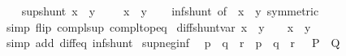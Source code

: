 \begin{isabellebody}
\endisatagproof
{\isafoldproof}%
%
\isadelimproof
\isanewline
%
\endisadelimproof
\ \ \isanewline
{}\isamarkupfalse%
\ sup{\isacharunderscore}{\kern0pt}shunt{\isacharcolon}{\kern0pt}\ {\isachardoublequoteopen}{\isacharparenleft}{\kern0pt}x\ {\isasymsqunion}\ y\ {\isacharequal}{\kern0pt}\ {\isasymtop}{\isacharparenright}{\kern0pt}\ {\isasymlongleftrightarrow}\ {\isacharparenleft}{\kern0pt}{\isacharminus}{\kern0pt}\ x\ {\isasymle}\ y{\isacharparenright}{\kern0pt}{\isachardoublequoteclose}\isanewline
%
\isadelimproof
\ \ %
\endisadelimproof
%
\isatagproof
{}\isamarkupfalse%
\ inf{\isacharunderscore}{\kern0pt}shunt\ {\isacharbrackleft}{\kern0pt}of\ {\isacartoucheopen}{\isacharminus}{\kern0pt}\ x{\isacartoucheclose}\ {\isacartoucheopen}{\isacharminus}{\kern0pt}\ y{\isacartoucheclose}{\isacharcomma}{\kern0pt}\ symmetric{\isacharbrackright}{\kern0pt}\ \isanewline
\ \ \isamarkupfalse%
\ {\isacharparenleft}{\kern0pt}simp\ flip{\isacharcolon}{\kern0pt}\ compl{\isacharunderscore}{\kern0pt}sup\ compl{\isacharunderscore}{\kern0pt}top{\isacharunderscore}{\kern0pt}eq{\isacharparenright}{\kern0pt}%
\endisatagproof
{\isafoldproof}%
%
\isadelimproof
\isanewline
%
\endisadelimproof
\isanewline
{}\isamarkupfalse%
\ diff{\isacharunderscore}{\kern0pt}shunt{\isacharunderscore}{\kern0pt}var{\isacharcolon}{\kern0pt}\ {\isachardoublequoteopen}{\isacharparenleft}{\kern0pt}x\ {\isacharminus}{\kern0pt}\ y\ {\isacharequal}{\kern0pt}\ {\isasymbottom}{\isacharparenright}{\kern0pt}\ {\isasymlongleftrightarrow}\ {\isacharparenleft}{\kern0pt}x\ {\isasymle}\ y{\isacharparenright}{\kern0pt}{\isachardoublequoteclose}\isanewline
%
\isadelimproof
\ \ %
\endisadelimproof
%
\isatagproof
{}\isamarkupfalse%
\ {\isacharparenleft}{\kern0pt}simp\ add{\isacharcolon}{\kern0pt}\ diff{\isacharunderscore}{\kern0pt}eq\ inf{\isacharunderscore}{\kern0pt}shunt{\isacharparenright}{\kern0pt}%
\endisatagproof
{\isafoldproof}%
%
\isadelimproof
\isanewline
%
\endisadelimproof
\isanewline
{}\isamarkupfalse%
\ sup{\isacharunderscore}{\kern0pt}neg{\isacharunderscore}{\kern0pt}inf{\isacharcolon}{\kern0pt}\isanewline
\ \ {\isacartoucheopen}p\ {\isasymle}\ q\ {\isasymsqunion}\ r\ {\isasymlongleftrightarrow}\ p\ {\isasymsqinter}\ {\isacharminus}{\kern0pt}q\ {\isasymle}\ r{\isacartoucheclose}\ \ {\isacharparenleft}{\kern0pt}\ {\isacartoucheopen}{\isacharquery}{\kern0pt}P\ {\isasymlongleftrightarrow}\ {\isacharquery}{\kern0pt}Q{\isacartoucheclose}{\isacharparenright}{\kern0pt}\isanewline
%
\isadelimproof
%
\endisadelimproof

\end{isabellebody}
